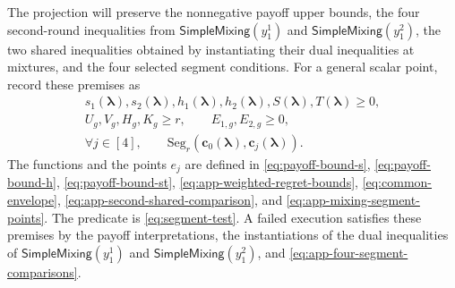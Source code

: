 \documentclass[11pt]{article}
\theoremstyle{remark}
\theoremstyle{plain}
\newcommand{\sm}{\mathsf{SimpleMixing}}
\begin{document}
The projection will preserve the nonnegative payoff upper bounds,
the four second-round inequalities from $\sm(y_1^1)$
and $\sm(y_1^2)$, the two shared inequalities obtained by
instantiating their dual inequalities at mixtures, and the four
selected segment conditions.
For a general scalar point, record these premises as
\begin{equation}
 \begin{gathered}
 s_1(\boldsymbol\lambda),s_2(\boldsymbol\lambda),h_1(\boldsymbol\lambda),h_2(\boldsymbol\lambda),S(\boldsymbol\lambda),T(\boldsymbol\lambda)\ge0,\\
 U_g,V_g,H_g,K_g\ge r,\qquad E_{1,g},E_{2,g}\ge0,\\
 \forall j\in[4],\qquad
 \mathrm{Seg}_r(\boldsymbol c_0(\boldsymbol\lambda),\boldsymbol c_j(\boldsymbol\lambda)).
 \end{gathered}
 \label{eq:app-g-projection-premises}
\end{equation}
The functions and the points $e_j$ are defined in
\eqref{eq:payoff-bound-s}, \eqref{eq:payoff-bound-h},
\eqref{eq:payoff-bound-st},
\eqref{eq:app-weighted-regret-bounds},
\eqref{eq:common-envelope},
\eqref{eq:app-second-shared-comparison}, and
\eqref{eq:app-mixing-segment-points}. The predicate is
\eqref{eq:segment-test}. A failed execution satisfies these premises
by the payoff interpretations, the instantiations of the dual
inequalities of $\sm(y_1^1)$ and $\sm(y_1^2)$, and
\eqref{eq:app-four-segment-comparisons}.
\end{document}
